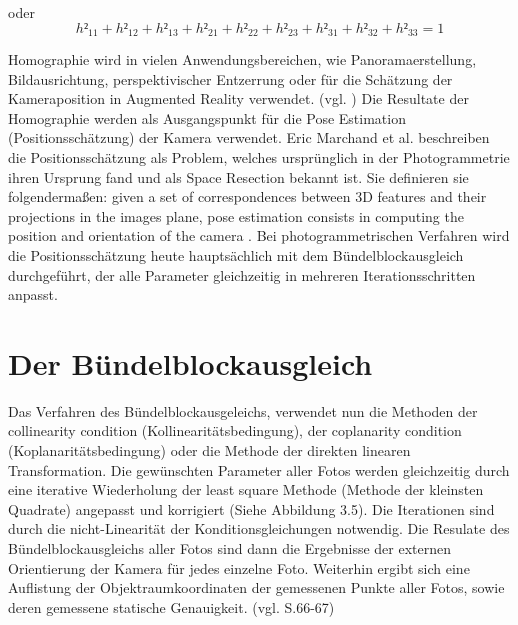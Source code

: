oder 
\begin{equation}
h²_{11} + h²_{12} + h²_{13} + h²_{21} + h²_{22} + h²_{23} + h²_{31} + h²_{32} + h²_{33} = 1
\end{equation}

Homographie wird in vielen Anwendungsbereichen, wie Panoramaerstellung, Bildausrichtung, perspektivischer Entzerrung oder für die Schätzung der Kameraposition in Augmented Reality verwendet. (vgl. \cite{homography}) Die Resultate der Homographie werden als Ausgangspunkt für die \glqq Pose Estimation\grqq{} (Positionsschätzung) der Kamera verwendet.  Eric Marchand et al. \cite{natural_feature} beschreiben die Positionsschätzung als Problem, welches ursprünglich in der Photogrammetrie ihren Ursprung fand und als \glqq Space Resection\grqq{} bekannt ist. Sie definieren sie folgendermaßen: \glqq given a set of correspondences between 3D features and their projections in the images plane, pose estimation consists in computing the position and orientation of the camera \grqq{}. Bei photogrammetrischen Verfahren wird die Positionsschätzung heute hauptsächlich mit dem Bündelblockausgleich durchgeführt, der alle Parameter gleichzeitig in mehreren Iterationsschritten anpasst.


\section{Der Bündelblockausgleich}

Das Verfahren des Bündelblockausgeleichs, verwendet nun die Methoden der \glqq collinearity condition \grqq{} (Kollinearitätsbedingung), der \glqq coplanarity condition\grqq{} (Koplanaritätsbedingung) oder die Methode der direkten linearen Transformation. Die gewünschten Parameter aller Fotos werden gleichzeitig durch eine iterative Wiederholung der \glqq least square\grqq{} Methode (Methode der kleinsten Quadrate) angepasst und korrigiert (Siehe Abbildung 3.5). Die Iterationen sind durch die nicht-Linearität der Konditionsgleichungen notwendig. Die Resulate des Bündelblockausgleichs aller Fotos sind dann die Ergebnisse der externen Orientierung der Kamera für jedes einzelne Foto. Weiterhin ergibt sich eine Auflistung der Objektraumkoordinaten der gemessenen Punkte aller Fotos, sowie deren gemessene statische Genauigkeit. (vgl. \cite{comparative_conditions_study} S.66-67)

